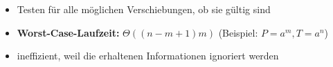 \vspace*{-0.75\baselineskip}\begin{itemize}[itemsep=-1pt]
	\item Testen für alle möglichen Verschiebungen, ob sie gültig sind
	\item \textbf{Worst-Case-Laufzeit:} $\Theta((n-m+1)m)$ (Beispiel: $P=a^m, T=a^n$)
	\item ineffizient, weil die erhaltenen Informationen ignoriert werden
\end{itemize}